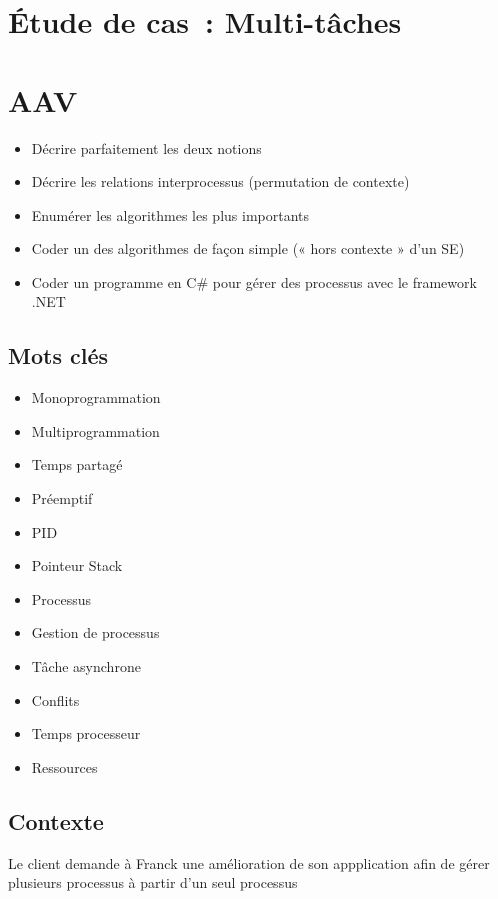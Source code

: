 \newpage
\section*{Étude de cas~: Multi-tâches}

\section*{AAV}
\begin{itemize}
	\item [3] Décrire parfaitement les deux notions
	\item [3] Décrire les relations interprocessus (permutation de contexte)
	\item [1] Enumérer les algorithmes les plus importants
	\item [3] Coder un des algorithmes de façon simple (« hors contexte » d'un SE)
	\item [3] Coder un programme en C\# pour gérer des processus avec le framework .NET
\end{itemize}

\newpage

\subsection*{Mots clés}
{}
\begin{itemize}
	\item Monoprogrammation
	\item Multiprogrammation
	\item Temps partagé
	\item Préemptif
	\item PID
	\item Pointeur Stack
	\item Processus
	\item Gestion de processus
	\item Tâche asynchrone
	\item Conflits
	\item Temps processeur
	\item Ressources
\end{itemize}

\subsection*{Contexte}
{}
\noindent Le client demande à Franck une amélioration de son appplication afin de gérer plusieurs processus à partir d'un seul processus

